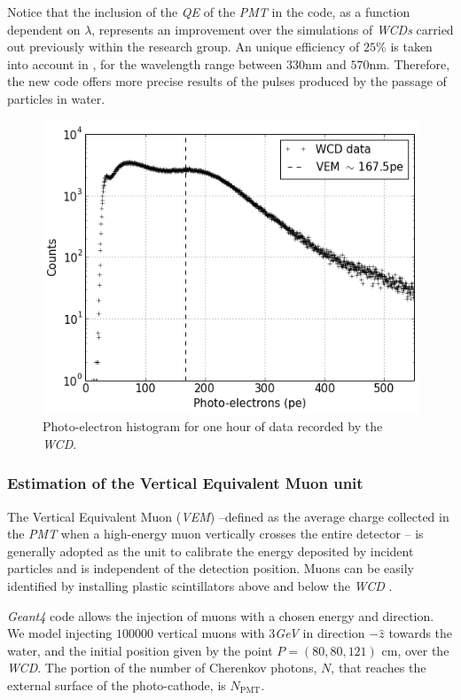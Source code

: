 \documentclass[submitting]{nst}
\begin{document}
Notice that the inclusion of the \textsl{QE} of the \textsl{PMT} in the code, as a function dependent on $\lambda$, represents an improvement over the simulations of \textsl{WCDs} carried out previously within the research group. An unique efficiency of $25$\% is taken into account in \cite{CalderonAsoreyNunez2015}, for the wavelength range between $330$nm and $570$nm. Therefore, the new code offers more precise results of the pulses produced by the passage of particles in water. 
 
 \begin{figure}
    \centering
    \includegraphics[scale=0.45]{Figures/WCDpedata.png}
    \caption{Photo-electron histogram for one hour of data recorded by the \textsl{WCD}. }
    \label{WCDpe}
\end{figure}

 
 \subsubsection{Estimation of the Vertical Equivalent Muon unit}
The Vertical Equivalent Muon (\textsl{VEM}) --defined as the average charge collected in the \textsl{PMT} when a high-energy muon vertically crosses the entire detector --  is generally adopted as the unit to calibrate the energy deposited by incident particles and is independent of the detection position.   Muons can be easily identified by installing plastic scintillators above and below the \textsl{WCD} \cite{EtchegoyenEtal2005}.
 
\textsl{Geant4} code allows the injection of muons with a chosen energy and direction. We model injecting  $100000$ vertical muons with $3$\textsl{GeV}  in direction $-\hat{z}$ towards the water, and the initial position given by the point $ P=(80, 80, 121)$ cm, over the \textsl{WCD}. The portion of the number of Cherenkov photons, $N$, that reaches the external surface of the photo-cathode, is $N_{\mathrm{PMT}}$. 
\end{document}
